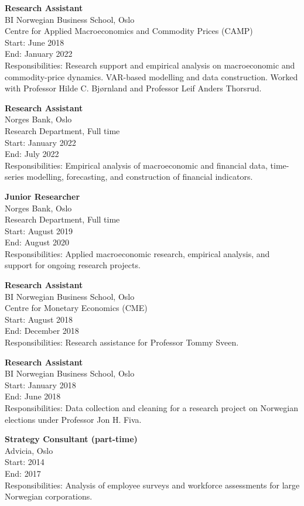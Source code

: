 \documentclass[11pt,a4paper]{article}
\begin{document}
\textbf{Research Assistant}\\
BI Norwegian Business School, Oslo\\
Centre for Applied Macroeconomics and Commodity Prices (CAMP)\\
Start: June 2018\\
End: January 2022\\
Responsibilities: Research support and empirical analysis on macroeconomic and commodity-price dynamics. VAR-based modelling and data construction. Worked with Professor Hilde C. Bjørnland and Professor Leif Anders Thorsrud.

\textbf{Research Assistant}\\
Norges Bank, Oslo\\
Research Department, Full time\\
Start: January 2022\\
End: July 2022\\
Responsibilities: Empirical analysis of macroeconomic and financial data, time-series modelling, forecasting, and construction of financial indicators.

\textbf{Junior Researcher}\\
Norges Bank, Oslo\\
Research Department, Full time\\
Start: August 2019\\
End: August 2020\\
Responsibilities: Applied macroeconomic research, empirical analysis, and support for ongoing research projects.

\textbf{Research Assistant}\\
BI Norwegian Business School, Oslo\\
Centre for Monetary Economics (CME)\\
Start: August 2018\\
End: December 2018\\
Responsibilities: Research assistance for Professor Tommy Sveen.

\textbf{Research Assistant}\\
BI Norwegian Business School, Oslo\\
Start: January 2018\\
End: June 2018\\
Responsibilities: Data collection and cleaning for a research project on Norwegian elections under Professor Jon H. Fiva.

\textbf{Strategy Consultant (part-time)}\\
Advicia, Oslo\\
Start: 2014\\
End: 2017\\
Responsibilities: Analysis of employee surveys and workforce assessments for large Norwegian corporations.
\end{document}
